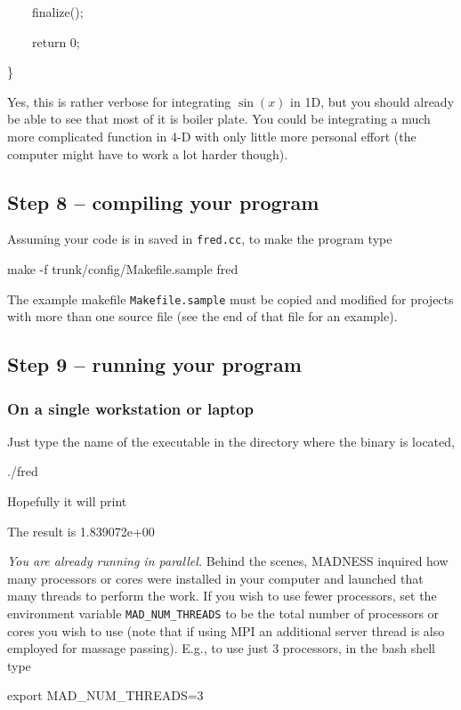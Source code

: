 \documentclass[letterpaper]{article}
\begin{document}
{\ttfamily
\ \ \ \ finalize();}

{\ttfamily
\ \ \ \ return 0;}

{\ttfamily
\}}


\bigskip

Yes, this is rather verbose for integrating  $\sin (x)$ in 1D, but you should already be able to see that most of it is
boiler plate. You could be integrating a much more complicated function in 4-D with only little more personal effort
(the computer might have to work a lot harder though).

\subsection{Step 8 -- compiling your program}
Assuming your code is in saved in \texttt{fred.cc}, to make the program type

{\ttfamily
make -f trunk/config/Makefile.sample fred}

The example makefile \texttt{Makefile.sample} must be copied and modified for projects with more than one source file
(see the end of that file for an example).

\subsection{Step 9 -- running your program}
\subsubsection{On a single workstation or laptop}
Just type the name of the executable in the directory where the binary is located,

{\ttfamily
./fred}


\bigskip

Hopefully it will print

{\ttfamily
The result is 1.839072e+00}


\bigskip

\textit{You are already running in parallel. }Behind the scenes, MADNESS inquired how many processors or cores were
installed in your computer and launched that many threads to perform the work. If you wish to use fewer processors, set
the environment variable \texttt{MAD\_NUM\_THREADS} to be the total number of processors or cores you wish to use (note
that if using MPI an additional server thread is also employed for massage passing). E.g., to use just 3 processors, in
the bash shell type

{\ttfamily
export MAD\_NUM\_THREADS=3}
\end{document}
